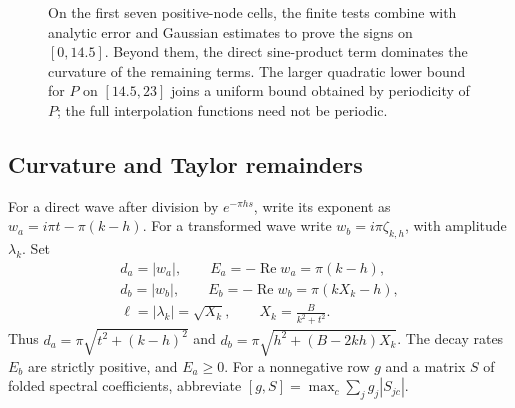 \documentclass[11pt]{article}
\theoremstyle{remark}\newtheorem{remark}[theorem]{Remark}
\begin{document}
\begin{figure}[H]
\centering
{}
\caption{On the first seven positive-node cells, the finite tests combine
with analytic error and Gaussian estimates to prove the signs on
$[0,14.5]$. Beyond them, the direct sine-product term dominates the
curvature of the remaining terms. The larger quadratic lower bound for
$P$ on $[14.5,23]$ joins a uniform bound obtained by periodicity of $P$;
the full interpolation functions need not be periodic.}
\label{fig:sign-ranges}
\end{figure}

\subsection{Curvature and Taylor remainders}

For a direct wave after division by $e^{-\pi hs}$, write its exponent
as $w_a=i\pi t-\pi(k-h)$.  For a transformed wave write
$w_b=i\pi\zeta_{k,h}$, with amplitude $\lambda_k$.  Set
\[
 \begin{gathered}
 d_a=|w_a|,\qquad E_a=-\operatorname{Re}w_a=\pi(k-h),\\
 d_b=|w_b|,\qquad E_b=-\operatorname{Re}w_b=\pi(kX_k-h),\\
 \ell=|\lambda_k|=\sqrt{X_k},\qquad X_k=\frac{B}{k^2+t^2}.
 \end{gathered}
\]
Thus $d_a=\pi\sqrt{t^2+(k-h)^2}$ and
$d_b=\pi\sqrt{h^2+(B-2kh)X_k}$.  The decay rates $E_b$ are
strictly positive, and $E_a\ge0$.  For a nonnegative row $g$ and a
matrix $S$ of folded spectral coefficients, abbreviate
$[g,S]=\max_c\sum_j g_j|S_{jc}|$.
\end{document}
